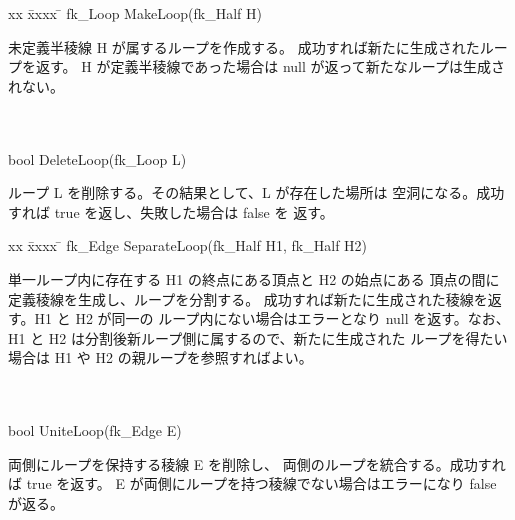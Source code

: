 
\begin{tabbing}
xx \= xxxx \= \kill
 \> fk\_Loop MakeLoop(fk\_Half H) \\
	\> \> \begin{minipage}[]{15cm}
		未定義半稜線 H が属するループを作成する。
		成功すれば新たに生成されたループを返す。
		H が定義半稜線であった場合は null が返って新たなループは生成されない。
	\end{minipage} \\ \\

 \> bool DeleteLoop(fk\_Loop L) \\
	\> \> \begin{minipage}[]{15cm}
		ループ L を削除する。その結果として、L が存在した場所は
		空洞になる。成功すれば true を返し、失敗した場合は false を
		返す。
	\end{minipage}
\end{tabbing}


\begin{tabbing}
xx \= xxxx \= \kill
 \> fk\_Edge SeparateLoop(fk\_Half H1, fk\_Half H2) \\
	\> \> \begin{minipage}[]{15cm}
		単一ループ内に存在する H1 の終点にある頂点と H2 の始点にある
		頂点の間に定義稜線を生成し、ループを分割する。
		成功すれば新たに生成された稜線を返す。H1 と H2 が同一の
		ループ内にない場合はエラーとなり null を返す。なお、
		H1 と H2 は分割後新ループ側に属するので、新たに生成された
		ループを得たい場合は H1 や H2 の親ループを参照すればよい。
	\end{minipage} \\ \\

 \> bool UniteLoop(fk\_Edge E) \\
	\> \> \begin{minipage}[]{15cm}
		両側にループを保持する稜線 E を削除し、
		両側のループを統合する。成功すれば true を返す。
		E が両側にループを持つ稜線でない場合はエラーになり false が返る。
	\end{minipage}
\end{tabbing}


